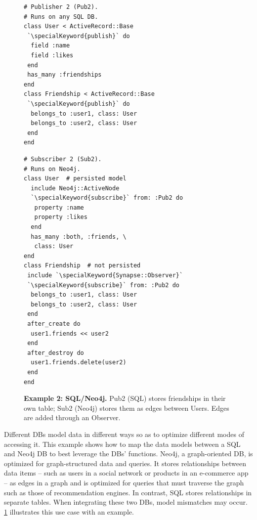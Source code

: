 \begin{figure}
\centering
\begin{minipage}{.45\textwidth}
  \begin{rbox}
\begin{lstlisting}
# Publisher 2 (Pub2).
# Runs on any SQL DB.
class User < ActiveRecord::Base
 `\specialKeyword{publish}` do
  field :name
  field :likes
 end
 has_many :friendships
end
class Friendship < ActiveRecord::Base
 `\specialKeyword{publish}` do
  belongs_to :user1, class: User
  belongs_to :user2, class: User
 end
end
\end{lstlisting}
\end{rbox}
\end{minipage}
\hspace{2em}
\begin{minipage}{.45\textwidth}
  \begin{rbox}
\begin{lstlisting}
# Subscriber 2 (Sub2).
# Runs on Neo4j.
class User  # persisted model
  include Neo4j::ActiveNode
  `\specialKeyword{subscribe}` from: :Pub2 do
   property :name
   property :likes
  end
  has_many :both, :friends, \
   class: User
end
class Friendship  # not persisted
 include `\specialKeyword{Synapse::Observer}`
 `\specialKeyword{subscribe}` from: :Pub2 do
  belongs_to :user1, class: User
  belongs_to :user2, class: User
 end
 after_create do
  user1.friends << user2
 end
 after_destroy do
  user1.friends.delete(user2)
 end
end
\end{lstlisting}
\end{rbox}
\end{minipage}

\caption{{\bf Example 2: SQL/Neo4j.}
Pub2 (SQL) stores friendships in their own table; Sub2 (Neo4j) stores
them as edges between Users. Edges are added through an Observer.}
\label{synapse:fig:sql-to-neo4j}
\end{figure}

Different DBs model data in different ways so as to optimize different modes of
accessing it. This example shows how to map the data models between a SQL and
Neo4j DB to best leverage the DBs' functions.  Neo4j, a graph-oriented DB, is
optimized for graph-structured data and queries. It stores relationships between
data items -- such as users in a social network or products in an e-commerce app
-- as edges in a graph and is optimized for queries that must traverse the graph
such as those of recommendation engines. In contrast, SQL stores relationships
in separate tables. When integrating these two DBs, model mismatches may occur.
\F\ref{synapse:fig:sql-to-neo4j} illustrates this use case with an example.


